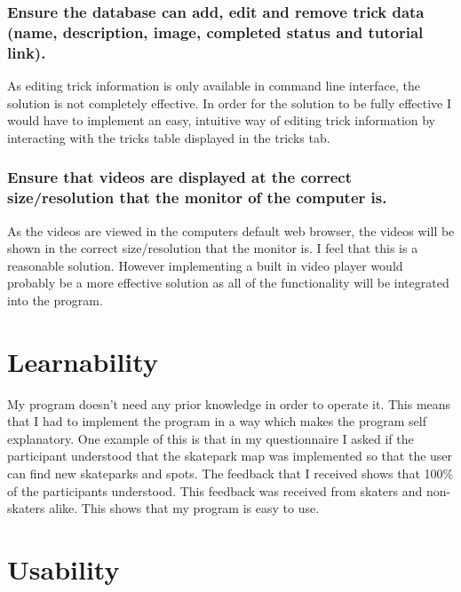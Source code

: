 	\subsubsection{Ensure the database can add, edit and remove trick data (name, description, image, completed status and tutorial link).}

As editing trick information is only available in command line interface, the solution is not completely effective. In order for the solution to be fully effective I would have to implement an easy, intuitive way of editing trick information by interacting with the tricks table displayed in the tricks tab.

	\subsubsection{Ensure that videos are displayed at the correct size/resolution that the monitor of the computer is.}

As the videos are viewed in the computers default web browser, the videos will be shown in the correct size/resolution that the monitor is. I feel that this is a reasonable solution. However implementing a built in video player would probably be a more effective solution as all of the functionality will be integrated into the program. 











\section{Learnability} %

My program doesn't need any prior knowledge in order to operate it. This means that I had to implement the program in a way which makes the program self explanatory. One example of this is that in my questionnaire I asked if the participant understood that the skatepark map was implemented so that the user can find new skateparks and spots. The feedback that I received shows that 100\% of the participants understood. This feedback was received from skaters and non-skaters alike. This shows that my program is easy to use.



\section{Usability} %

